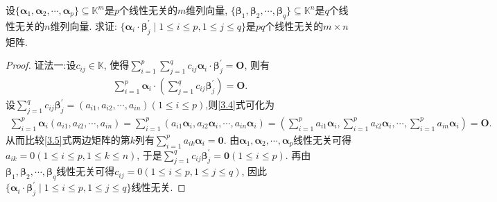 \documentclass[../../main.tex]{subfiles}%
\begin{document}
\begin{proposition}\label{proposition:线性无关的向量组与另一个转置的乘积积生成的矩阵也线性无关}
设\(\{\boldsymbol{\alpha}_{1},\boldsymbol{\alpha}_{2},\cdots,\boldsymbol{\alpha}_{p}\}\subseteq\mathbb{K}^{m}\)是\(p\)个线性无关的\(m\)维列向量, \(\{\boldsymbol{\beta}_{1},\boldsymbol{\beta}_{2},\cdots,\boldsymbol{\beta}_{q}\}\subseteq\mathbb{K}^{n}\)是\(q\)个线性无关的\(n\)维列向量. 求证: \(\{\boldsymbol{\alpha}_{i}\cdot\boldsymbol{\beta}_{j}^{\prime}\mid1\leqslant  i\leqslant  p,1\leqslant  j\leqslant  q\}\)是\(pq\)个线性无关的\(m\times n\)矩阵.
\end{proposition}
\begin{proof}

{\color{blue}证法一:}设\(c_{ij}\in\mathbb{K}\), 使得\(\sum_{i = 1}^{p}\sum_{j = 1}^{q}c_{ij}\boldsymbol{\alpha}_{i}\cdot\boldsymbol{\beta}_{j}^{\prime}=\boldsymbol{O}\), 则有
\begin{align}
\sum_{i = 1}^{p}\boldsymbol{\alpha}_{i}\cdot\left(\sum_{j = 1}^{q}c_{ij}\boldsymbol{\beta}_{j}^{\prime}\right)=\boldsymbol{O}.\label{3.4}
\end{align}
设\(\sum_{j = 1}^{q}c_{ij}\boldsymbol{\beta}_{j}^{\prime}=(a_{i1},a_{i2},\cdots,a_{in})(1\leqslant  i\leqslant  p)\),则\eqref{3.4}式可化为
\begin{align}\label{3.5}
\sum_{i=1}^p{\boldsymbol{\alpha }_i\left( a_{i1},a_{i2},\cdots ,a_{in} \right)}=\sum_{i=1}^p{\left( a_{i1}\boldsymbol{\alpha }_i,a_{i2}\boldsymbol{\alpha }_i,\cdots ,a_{in}\boldsymbol{\alpha }_i \right)}=\left( \sum_{i=1}^p{a_{i1}\boldsymbol{\alpha }_i},\sum_{i=1}^p{a_{i2}\boldsymbol{\alpha }_i},\cdots ,\sum_{i=1}^p{a_{in}\boldsymbol{\alpha }_i} \right) =\boldsymbol{O}.
\end{align}
从而比较\eqref{3.5}式两边矩阵的第\(k\)列有\(\sum_{i = 1}^{p}a_{ik}\boldsymbol{\alpha}_{i}=\boldsymbol{0}\). 由\(\boldsymbol{\alpha}_{1},\boldsymbol{\alpha}_{2},\cdots,\boldsymbol{\alpha}_{p}\)线性无关可得\(a_{ik}=0(1\leqslant  i\leqslant  p,1\leqslant  k\leqslant  n)\), 于是\(\sum_{j = 1}^{q}c_{ij}\boldsymbol{\beta}_{j}^{\prime}=\boldsymbol{0}(1\leqslant  i\leqslant  p)\). 再由\(\boldsymbol{\beta}_{1},\boldsymbol{\beta}_{2},\cdots,\boldsymbol{\beta}_{q}\)线性无关可得\(c_{ij}=0(1\leqslant  i\leqslant  p,1\leqslant  j\leqslant  q)\), 因此\(\{\boldsymbol{\alpha}_{i}\cdot\boldsymbol{\beta}_{j}^{\prime}\mid1\leqslant  i\leqslant  p,1\leqslant  j\leqslant  q\}\)线性无关. 


\end{proof}
\end{document}
